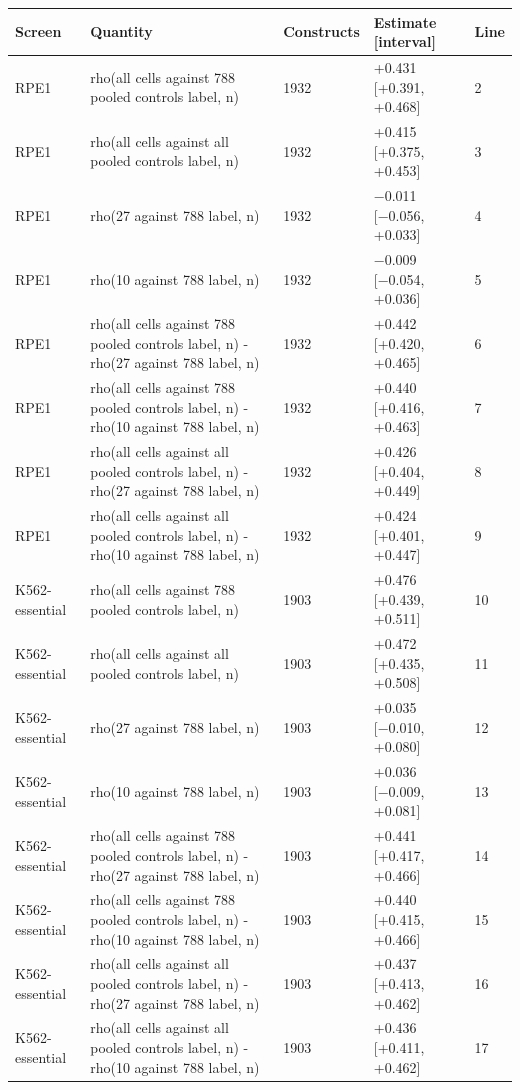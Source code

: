 \begin{tabular}{lllll}
\toprule
Screen & Quantity & Constructs & Estimate [interval] & Line \\
\midrule
RPE1 & rho(all cells against 788 pooled controls label, n) & 1932 & +0.431 [+0.391, +0.468] & 2 \\
RPE1 & rho(all cells against all pooled controls label, n) & 1932 & +0.415 [+0.375, +0.453] & 3 \\
RPE1 & rho(27 against 788 label, n) & 1932 & −0.011 [−0.056, +0.033] & 4 \\
RPE1 & rho(10 against 788 label, n) & 1932 & −0.009 [−0.054, +0.036] & 5 \\
RPE1 & rho(all cells against 788 pooled controls label, n) - rho(27 against 788 label, n) & 1932 & +0.442 [+0.420, +0.465] & 6 \\
RPE1 & rho(all cells against 788 pooled controls label, n) - rho(10 against 788 label, n) & 1932 & +0.440 [+0.416, +0.463] & 7 \\
RPE1 & rho(all cells against all pooled controls label, n) - rho(27 against 788 label, n) & 1932 & +0.426 [+0.404, +0.449] & 8 \\
RPE1 & rho(all cells against all pooled controls label, n) - rho(10 against 788 label, n) & 1932 & +0.424 [+0.401, +0.447] & 9 \\
K562-essential & rho(all cells against 788 pooled controls label, n) & 1903 & +0.476 [+0.439, +0.511] & 10 \\
K562-essential & rho(all cells against all pooled controls label, n) & 1903 & +0.472 [+0.435, +0.508] & 11 \\
K562-essential & rho(27 against 788 label, n) & 1903 & +0.035 [−0.010, +0.080] & 12 \\
K562-essential & rho(10 against 788 label, n) & 1903 & +0.036 [−0.009, +0.081] & 13 \\
K562-essential & rho(all cells against 788 pooled controls label, n) - rho(27 against 788 label, n) & 1903 & +0.441 [+0.417, +0.466] & 14 \\
K562-essential & rho(all cells against 788 pooled controls label, n) - rho(10 against 788 label, n) & 1903 & +0.440 [+0.415, +0.466] & 15 \\
K562-essential & rho(all cells against all pooled controls label, n) - rho(27 against 788 label, n) & 1903 & +0.437 [+0.413, +0.462] & 16 \\
K562-essential & rho(all cells against all pooled controls label, n) - rho(10 against 788 label, n) & 1903 & +0.436 [+0.411, +0.462] & 17 \\
\bottomrule
\end{tabular}
